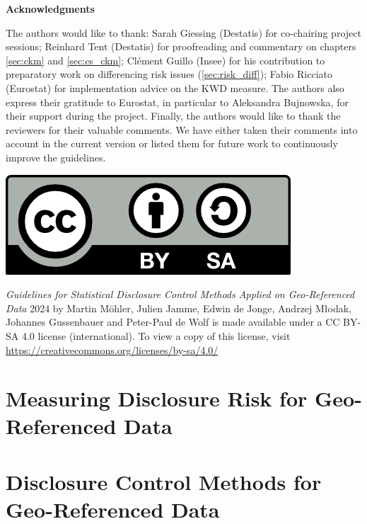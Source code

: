 \documentclass[openany,oneside]{book}
\begin{document}
\noindent \textbf{\large Acknowledgments}\bigskip

\noindent The authors would like to thank: Sarah Giessing (Destatis) for co-chairing project sessions; Reinhard Tent (Destatis) for proofreading and commentary on chapters \ref{sec:ckm} and \ref{sec:cs_ckm};  Clément Guillo (Insee) for his contribution to preparatory work on differencing risk issues (\ref{sec:risk_diff}); Fabio Ricciato (Eurostat) for implementation advice on the KWD measure.
The authors also express their gratitude to Eurostat, in particular to Aleksandra Bujnowska, for their support during the project. Finally, the authors would like to thank the reviewers for their valuable comments. We have either taken their comments into account in the current version or listed them for future work to continuously improve the guidelines.
\vfill

\noindent\includegraphics[scale=0.5]{by-sa.png}

\noindent 
\textit{Guidelines for Statistical Disclosure Control Methods Applied on Geo-Referenced Data} \ccCopy{} 2024 by Martin M\"{o}hler, Julien Jamme, Edwin de Jonge, Andrzej M{\l}odak, Johannes Gussenbauer and Peter-Paul de Wolf is made available under a CC BY-SA 4.0 license (international). To view a copy of this license, visit \url{https://creativecommons.org/licenses/by-sa/4.0/}

\newpage


\tableofcontents





\chapter{Measuring Disclosure Risk for Geo-Referenced Data} 
\label{sec:risk}
    
    



\chapter{Disclosure Control Methods for Geo-Referenced Data} \label{sec:methods}
    
    
    
    
    
    
\end{document}
